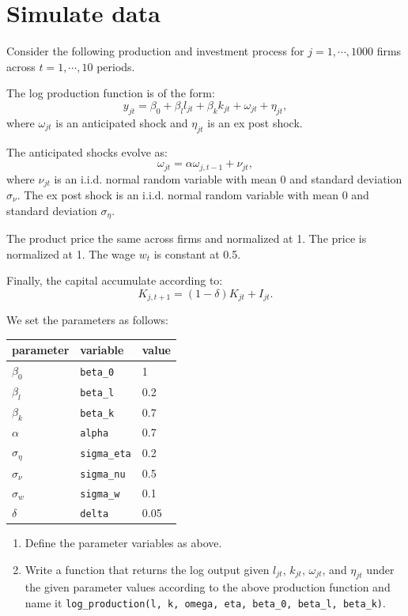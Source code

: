 \documentclass[
]{book}
\begin{document}
\hypertarget{simulate-data-1}{%
\section{Simulate data}\label{simulate-data-1}}

Consider the following production and investment process for \(j = 1, \cdots, 1000\) firms across \(t = 1, \cdots, 10\) periods.

The log production function is of the form:
\[
y_{jt} = \beta_0 + \beta_l l_{jt} + \beta_k k_{jt} + \omega_{jt} + \eta_{jt},
\]
where \(\omega_{jt}\) is an anticipated shock and \(\eta_{jt}\) is an ex post shock.

The anticipated shocks evolve as:
\[
\omega_{jt} = \alpha \omega_{j, t - 1} + \nu_{jt},
\]
where \(\nu_{jt}\) is an i.i.d. normal random variable with mean 0 and standard deviation \(\sigma_\nu\). The ex post shock is an i.i.d. normal random variable with mean 0 and standard deviation \(\sigma_{\eta}\).

The product price the same across firms and normalized at 1. The price is normalized at 1. The wage \(w_t\) is constant at 0.5.

Finally, the capital accumulate according to:
\[
K_{j, t + 1} = (1 - \delta) K_{jt} + I_{jt}.
\]

We set the parameters as follows:

\begin{longtable}[]{@{}lll@{}}
\toprule()
parameter & variable & value \\
\midrule()
\endhead
\(\beta_0\) & \texttt{beta\_0} & 1 \\
\(\beta_l\) & \texttt{beta\_l} & 0.2 \\
\(\beta_k\) & \texttt{beta\_k} & 0.7 \\
\(\alpha\) & \texttt{alpha} & 0.7 \\
\(\sigma_{\eta}\) & \texttt{sigma\_eta} & 0.2 \\
\(\sigma_{\nu}\) & \texttt{sigma\_nu} & 0.5 \\
\(\sigma_{w}\) & \texttt{sigma\_w} & 0.1 \\
\(\delta\) & \texttt{delta} & 0.05 \\
\bottomrule()
\end{longtable}

\begin{enumerate}
\def\labelenumi{\arabic{enumi}.}
\item
  Define the parameter variables as above.
\item
  Write a function that returns the log output given \(l_{jt}\), \(k_{jt}\), \(\omega_{jt}\), and \(\eta_{jt}\) under the given parameter values according to the above production function and name it \texttt{log\_production(l,\ k,\ omega,\ eta,\ beta\_0,\ beta\_l,\ beta\_k)}.
\end{enumerate}
\end{document}

